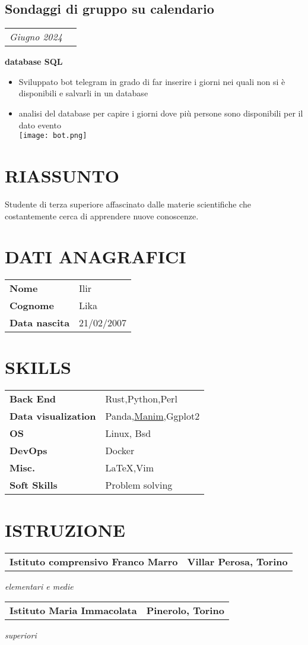 \documentclass[11pt,a4paper]{moderncv}
\newcommand*{\experienceentry}[3][1.5mm]{
    \subsection{#2} \vspace{-1.5mm}
    \begin{tabularx}{\textwidth}{LR}
        {\itshape #3}
    \end{tabularx}
    \par\addvspace{#1}
}
\newcommand*{\educationentry}[4][0.5mm]{
    \begin{tabularx}{\textwidth}{LR}
        {\bfseries #3} & {\bfseries #4} \\
    \end{tabularx}
    {\itshape #2}
    \par\addvspace{#1}
}
\begin{document}
\begin{minipage}[t]{0.62\textwidth}
\experienceentry{Sondaggi di gruppo su calendario}{Giugno 2024}

\textbf{database SQL}
\begin{itemize}
    \item Sviluppato bot telegram in grado di far inserire i giorni nei quali non si è disponibili e salvarli in un database 
    \item analisi del database per capire i giorni dove più persone sono disponibili per il dato evento  \\
    \texttt{[image: bot.png]}
\end{itemize}
\end{minipage}
\hfill
\begin{minipage}[t]{0.35\textwidth}
\section{RIASSUNTO}
Studente di terza superiore affascinato dalle materie scientifiche che costantemente cerca di apprendere nuove conoscenze.

\section{DATI ANAGRAFICI}
\begin{tabularx}{\textwidth}{>{\bfseries}l@{\hskip 3.5mm}L}
Nome & Ilir \\
Cognome & Lika \\
Data nascita & 21/02/2007 \\
\end{tabularx}
\section{SKILLS}
\begin{tabularx}{\textwidth}{>{\bfseries}l@{\hskip 3.5mm}L}
Back End & Rust,Python,Perl \\
Data visualization & Panda,\href{https://www.manim.community/}{Manim},Ggplot2 \\
OS & Linux, Bsd\\
DevOps & Docker\\
Misc. & \LaTeX,Vim \\
Soft Skills & Problem solving
\end{tabularx}

\section{ISTRUZIONE}
\educationentry{elementari e medie}{Istituto comprensivo Franco Marro}{Villar Perosa, Torino}
\par
\vspace{3.0mm}
\educationentry{superiori}{Istituto Maria Immacolata}{Pinerolo, Torino}


\end{minipage}
\end{document}
